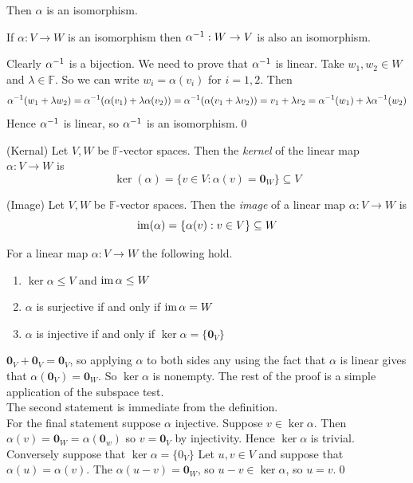 \documentclass{article}
\newcommand{\F}{\mathbb{F}}
\begin{document}
Then $ \alpha $ is an isomorphism.
\begin{proposition}
  If $ \alpha: V\to W $ is an isomorphism then $ {\alpha}^{-1}:W\to V $ is also an isomorphism.
\end{proposition}
\pf Clearly $ {\alpha}^{-1} $ is a bijection. We need to prove that $ {\alpha}^{-1} $ is linear. Take $ w_1,w_2\in W $ and $ \lambda\in \F $. So we can write $ w_i=\alpha(v_i) $ for $ i=1,2 $. Then
\[
{\alpha}^{-1}(w_1+\lambda w_2)={\alpha}^{-1}(\alpha(v_1)+\lambda\alpha(v_2))={\alpha}^{-1}(\alpha(v_1+\lambda v_2))=v_1+\lambda v_2={\alpha}^{-1}(w_1)+\lambda{\alpha}^{-1}(w_2)
\]
Hence $ {\alpha}^{-1} $ is linear, so $ {\alpha}^{-1} $ is an isomorphism.\qed 
\begin{definition}
	(Kernal) Let $ V,W $ be $ \F $-vector spaces. Then the \textit{kernel} of the linear map $ \alpha:V\to W $ is
	\[
		\ker(\alpha)=\{v\in V:\alpha(v)=\mathbf 0_W\}\subseteq V
	\]
\end{definition}
\begin{definition}
	(Image) Let $ V,W $ be $ \F $-vector spaces. Then the \textit{image} of a linear map $ \alpha:V\to W $ is
	\[
		\operatorname{im}(\alpha)=\{\alpha(v):v\in V\}\subseteq W
	\]
\end{definition}
\begin{lemma}
  For a linear map $ \alpha:V\to W $ the following hold.
  \begin{enumerate}
	  \item $ \ker\alpha\le V $ and $ \operatorname{im} \alpha \le W $
	  \item $ \alpha $ is surjective if and only if $ \operatorname{im} \alpha =W $
	  \item $ \alpha $ is injective if and only if $ \ker\alpha=\{\mathbf 0_V\} $
  \end{enumerate}
\end{lemma}
\pf $ \mathbf 0_V+\mathbf 0_V=\mathbf 0_V $, so applying $ \alpha $ to both sides any using the fact that $ \alpha $ is linear gives that $ \alpha(\mathbf 0_V)=\mathbf 0_W $. So $ \ker\alpha $ is nonempty. The rest of the proof is a simple application of the subspace test.\\
The second statement is immediate from the definition.\\
For the final statement suppose $ \alpha $ injective. Suppose $ v\in \ker \alpha $. Then $ \alpha(v)=\mathbf 0_W=\alpha(\mathbf 0_w) $ so $ v=\mathbf 0_V $ by injectivity. Hence $ \ker\alpha $ is trivial.
Conversely suppose that $ \ker \alpha=\{0_V\} $ Let $ u,v\in V $ and suppose that $ \alpha(u)=\alpha(v) $. The $ \alpha(u-v)=\mathbf 0_W $, so $ u-v\in\ker\alpha $, so $ u=v $.\qed\par
\end{document}
